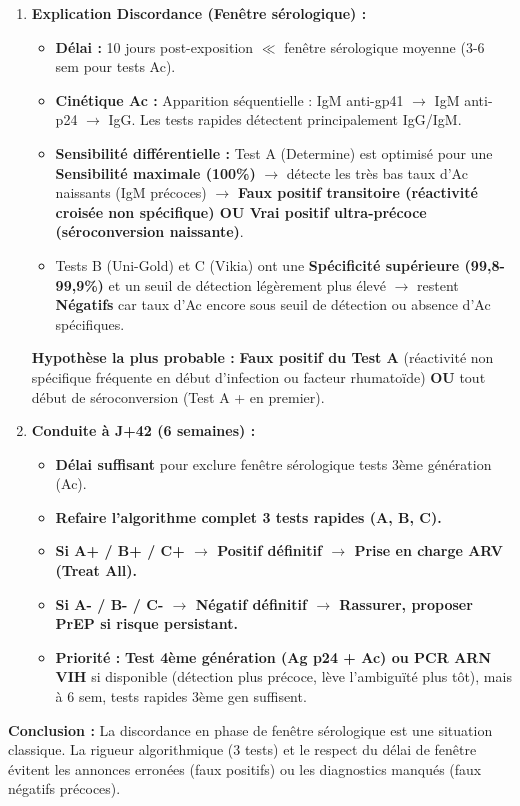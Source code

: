 \documentclass[11pt]{article}
\begin{document}
\begin{exoresolu}
\begin{enumerate}
    \item \textbf{Explication Discordance (Fenêtre sérologique) :}
    \begin{itemize}
        \item \textbf{Délai :} 10 jours post-exposition $\ll$ fenêtre sérologique moyenne (3-6 sem pour tests Ac).
        \item \textbf{Cinétique Ac :} Apparition séquentielle : IgM anti-gp41 $\rightarrow$ IgM anti-p24 $\rightarrow$ IgG. Les tests rapides détectent principalement IgG/IgM.
        \item \textbf{Sensibilité différentielle :} Test A (Determine) est optimisé pour une \textbf{Sensibilité maximale (100\%)} $\rightarrow$ détecte les très bas taux d'Ac naissants (IgM précoces) $\rightarrow$ \textbf{Faux positif transitoire (réactivité croisée non spécifique) OU Vrai positif ultra-précoce (séroconversion naissante)}.
        \item Tests B (Uni-Gold) et C (Vikia) ont une \textbf{Spécificité supérieure (99,8-99,9\%)} et un seuil de détection légèrement plus élevé $\rightarrow$ restent \textbf{Négatifs} car taux d'Ac encore sous seuil de détection ou absence d'Ac spécifiques.
    \end{itemize}
    \textbf{Hypothèse la plus probable :} \textbf{Faux positif du Test A} (réactivité non spécifique fréquente en début d'infection ou facteur rhumatoïde) \textbf{OU} tout début de séroconversion (Test A + en premier).
    \item \textbf{Conduite à J+42 (6 semaines) :}
    \begin{itemize}
        \item \textbf{Délai suffisant} pour exclure fenêtre sérologique tests 3ème génération (Ac).
        \item \textbf{Refaire l'algorithme complet 3 tests rapides (A, B, C).}
        \item \textbf{Si A+ / B+ / C+ $\rightarrow$ Positif définitif $\rightarrow$ Prise en charge ARV (Treat All).}
        \item \textbf{Si A- / B- / C- $\rightarrow$ Négatif définitif $\rightarrow$ Rassurer, proposer PrEP si risque persistant.}
        \item \textbf{Priorité :} \textbf{Test 4ème génération (Ag p24 + Ac) ou PCR ARN VIH} si disponible (détection plus précoce, lève l'ambiguïté plus tôt), mais à 6 sem, tests rapides 3ème gen suffisent.
    \end{itemize}
\end{enumerate}
\textbf{Conclusion :} La discordance en phase de fenêtre sérologique est une situation classique. La rigueur algorithmique (3 tests) et le respect du délai de fenêtre évitent les annonces erronées (faux positifs) ou les diagnostics manqués (faux négatifs précoces).
\end{exoresolu}
\end{document}
